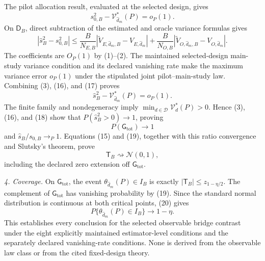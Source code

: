 The pilot allocation result, evaluated at the selected design, gives
\[
 s_{0,B}^2-\mathcal V_{\widehat d_m}^*(P)=o_P(1).          \tag{16}
\]
On \(\mathsf D_B\), direct subtraction of the estimated and oracle variance formulas gives
\[
 |\widehat s_B^2-s_{0,B}^2|
 \le \frac{B}{N_{E,B}}
 |\widetilde V_{E,\widehat d_m,B}-V_{E,\widehat d_m}|
 +\frac{B}{N_{O,B}}
 |\widetilde V_{O,\widehat d_m,B}-V_{O,\widehat d_m}|.  \tag{17}
\]
The coefficients are \(O_P(1)\) by (1)--(2).  The maintained selected-design main-study variance condition and its declared vanishing rate make the maximum variance error \(o_P(1)\) under the stipulated joint pilot--main-study law.  Combining (3), (16), and (17) proves
\[
 \widehat s_B^2-\mathcal V_{\widehat d_m}^*(P)=o_P(1).    \tag{18}
\]
The finite family and nondegeneracy imply \(\min_{d\in\mathcal D}\mathcal V_d^*(P)>0\).  Hence (3), (16), and (18) show that \(P(\widehat s_B^2>0)\to1\), proving
\[
 P(\mathsf G_{\mathrm{tot}})\longrightarrow1             \tag{19}
\]
and \(\widehat s_B/s_{0,B}\to_P1\).  Equations (15) and (19), together with this ratio convergence and Slutsky's theorem, prove
\[
 \mathsf T_B\rightsquigarrow\mathcal N(0,1),             \tag{20}
\]
including the declared zero extension off \(\mathsf G_{\mathrm{tot}}\).

\emph{4. Coverage.}
On \(\mathsf G_{\mathrm{tot}}\), the event \(\theta_{\widehat d_m}(P)\in I_B\) is exactly \(|\mathsf T_B|\le z_{1-\eta/2}\).  The complement of \(\mathsf G_{\mathrm{tot}}\) has vanishing probability by (19).  Since the standard normal distribution is continuous at both critical points, (20) gives
\[
 P\{\theta_{\widehat d_m}(P)\in I_B\}\longrightarrow1-\eta.
\]
This establishes every conclusion for the selected observable bridge contrast under the eight explicitly maintained estimator-level conditions and the separately declared vanishing-rate conditions.  None is derived from the observable law class or from the cited fixed-design theory.